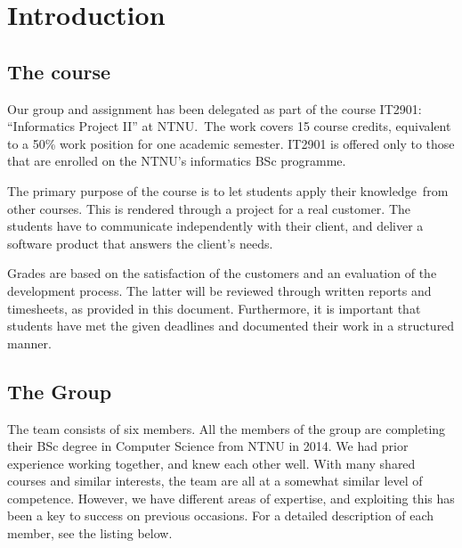 \chapter{Introduction}
\section{The course}
Our group and assignment has been delegated as part of the course
IT2901: ``Informatics Project II''
at NTNU.\ The work covers 15 course credits, equivalent to a 50\% work
position for one academic semester. IT2901 is offered only to those
that are enrolled on the NTNU's informatics BSc
programme.

The primary purpose of the course is to let students apply their
knowledge\ from other courses. This is rendered through a project for a
real customer. The students have to communicate independently with
their client, and deliver a software product that answers the
client's needs. 

Grades are based on the satisfaction of the customers and an evaluation
of the development process. The latter will be reviewed through written
reports and timesheets, as provided in this document. Furthermore, it
is important that students have met the given deadlines and documented
their work in a structured manner.

\section{The Group}

The team consists of six members. All the members of the group are
completing their BSc degree in Computer Science from NTNU in 2014. We
had prior experience working together, and knew each other well. With
many shared courses and similar interests, the team are all at a
somewhat similar level of competence. However, we have different areas
of expertise, and exploiting this has been a key to success on previous
occasions. For a detailed description of each member, see the listing
below.


